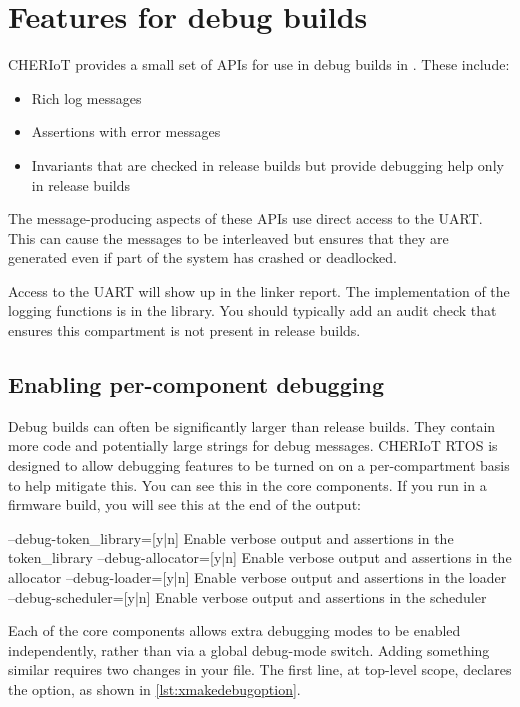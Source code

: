 \chapter[label=debug]{Features for debug builds}

CHERIoT provides a small set of APIs for use in debug builds in .
These include:

\begin{itemize}
	\item{Rich log messages}
	\item{Assertions with error messages}
	\item{Invariants that are checked in release builds but provide debugging help only in release builds}
\end{itemize}

The message-producing aspects of these APIs use direct access to the UART.
This can cause the messages to be interleaved but ensures that they are generated even if part of the system has crashed or deadlocked.

Access to the UART will show up in the linker report.
The implementation of the logging functions is in the  library.
You should typically add an audit check that ensures this compartment is not present in release builds.

\section{Enabling per-component debugging}

Debug builds can often be significantly larger than release builds.
They contain more code and potentially large strings for debug messages.
CHERIoT RTOS is designed to allow debugging features to be turned on on a per-compartment basis to help mitigate this.
You can see this in the core components.
If you run  in a firmware build, you will see this at the end of the output:

\begin{console}
--debug-token_library=[y|n] Enable verbose output and assertions in the token_library
--debug-allocator=[y|n]     Enable verbose output and assertions in the allocator
--debug-loader=[y|n]        Enable verbose output and assertions in the loader
--debug-scheduler=[y|n]     Enable verbose output and assertions in the scheduler
\end{console}

Each of the core components allows extra debugging modes to be enabled independently, rather than via a global debug-mode switch.
Adding something similar requires two changes in your  file.
The first line, at top-level scope, declares the option, as shown in \ref{lst:xmakedebugoption}.

